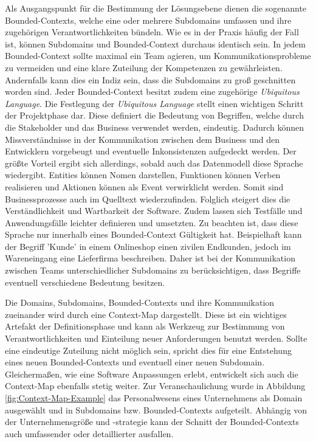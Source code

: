Als Ausgangspunkt für die Bestimmung der Lösungsebene dienen die sogenannte Bounded-Contexts, welche eine oder mehrere Subdomains umfassen und ihre zugehörigen Verantwortlichkeiten bündeln. Wie es in der Praxis häufig der Fall ist, können Subdomains und Bounded-Context durchaus identisch sein. In jedem Bounded-Context sollte maximal ein Team agieren, um Kommunikationsprobleme zu vermeiden und eine klare Zuteilung der Kompetenzen zu gewährleisten. Andernfalls kann dies ein Indiz sein, dass die Subdomains zu groß geschnitten worden sind. Jeder Bounded-Context besitzt zudem eine zugehörige \emph{Ubiquitous Language}. Die Festlegung der \emph{Ubiquitous Language} stellt einen wichtigen Schritt der Projektphase dar. Diese definiert die Bedeutung von Begriffen, welche durch die Stakeholder und das Business verwendet werden, eindeutig. Dadurch können Missverständnisse in der Kommunikation zwischen dem Business und den Entwicklern vorgebeugt und eventuelle Inkonsistenzen aufgedeckt werden. Der größte Vorteil ergibt sich allerdings, sobald auch das Datenmodell diese Sprache wiedergibt. Entities können Nomen darstellen, Funktionen können Verben realisieren und Aktionen können als Event verwirklicht werden. Somit sind Businessprozesse auch im Quelltext wiederzufinden. Folglich steigert dies die Verständlichkeit und Wartbarkeit der Software. Zudem lassen sich Testfälle und Anwendungsfälle leichter definieren und umsetzten. Zu beachten ist, dass diese Sprache nur innerhalb eines Bounded-Context Gültigkeit hat. Beispielhaft kann der Begriff 'Kunde' in einem Onlineshop einen zivilen Endkunden, jedoch im Wareneingang eine Lieferfirma beschreiben. Daher ist bei der Kommunikation zwischen Teams unterschiedlicher Subdomains zu berücksichtigen, dass Begriffe eventuell verschiedene Bedeutung besitzen. 

Die Domains, Subdomains, Bounded-Contexts und ihre Kommunikation zueinander wird durch eine Context-Map dargestellt. Diese ist ein wichtiges Artefakt der Definitionsphase und kann als Werkzeug zur Bestimmung von Verantwortlichkeiten und Einteilung neuer Anforderungen benutzt werden. Sollte eine eindeutige Zuteilung nicht möglich sein, spricht dies für eine Entstehung eines neuen Bounded-Contexts und eventuell einer neuen Subdomain. Gleichermaßen, wie eine Software Anpassungen erlebt, entwickelt sich auch die Context-Map ebenfalls stetig weiter. Zur Veranschaulichung wurde in Abbildung \ref{fig:Context-Map-Example} das Personalwesens eines Unternehmens als Domain ausgewählt und in Subdomains bzw. Bounded-Contexts aufgeteilt. Abhängig von der Unternehmensgröße und -strategie kann der Schnitt der Bounded-Contexts auch umfassender oder detaillierter ausfallen.

